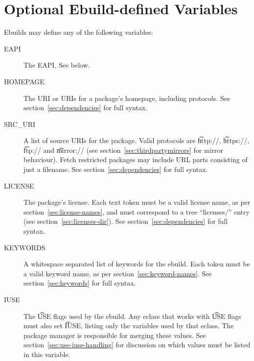 \section{Optional Ebuild-defined Variables}

Ebuilds may define any of the following variables:

\begin{description}
\item[EAPI] The EAPI\@. See below.
\item[HOMEPAGE] The URI or URIs for a package's homepage, including protocols.
    See section~\ref{sec:dependencies} for full syntax.
\item[SRC_URI] A list of source URIs for the package. Valid protocols are \t{http://},
    \t{https://}, \t{ftp://} and \t{mirror://} (see section~\ref{sec:thirdpartymirrors} for mirror
    behaviour). Fetch restricted packages may include URL parts consisting of just a filename.
    See section~\ref{sec:dependencies} for full syntax.
\item[LICENSE] The package's license. Each text token must be a valid license name, as per
    section~\ref{sec:license-names}, and must correspond to a tree ``licenses/'' entry
    (see section~\ref{sec:licenses-dir}). See section~\ref{sec:dependencies} for full syntax.
    \label{ebuild-var-LICENSE}
\item[KEYWORDS] A whitespace separated list of keywords for the ebuild. Each token must be a valid
    keyword name, as per section~\ref{sec:keyword-names}. See section~\ref{sec:keywords} for full
    syntax.
\item[IUSE] The \t{USE} flags used by the ebuild. Any eclass that works with \t{USE} flags must
    also set \t{IUSE}, listing only the variables used by that eclass. The package manager is
    responsible for merging these values. See section~\ref{sec:use-iuse-handling} for discussion on
    which values must be listed in this variable.


\end{description}
